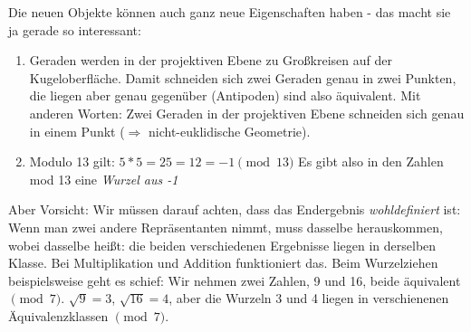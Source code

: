 \documentclass{article}
\begin{document}
Die neuen Objekte können auch ganz neue Eigenschaften haben - das macht sie ja
gerade so interessant:

\begin{enumerate}
\item Geraden werden in der projektiven Ebene zu Großkreisen auf der
  Kugeloberfläche. Damit schneiden sich zwei Geraden genau in zwei Punkten,
  die liegen aber genau gegenüber (Antipoden) sind also äquivalent. Mit
  anderen Worten: Zwei Geraden in der projektiven Ebene schneiden sich genau
  in einem Punkt ($\Rightarrow$ nicht-euklidische Geometrie).
\item Modulo 13 gilt: $ 5 * 5 = 25 = 12 = -1 \pmod{13} $
  Es gibt also in den Zahlen mod 13 eine \emph{Wurzel aus -1}
\end{enumerate}

Aber Vorsicht: Wir müssen darauf achten, dass das Endergebnis \emph{wohldefiniert}
ist: Wenn man zwei andere Repräsentanten nimmt, muss dasselbe herauskommen,
wobei dasselbe heißt: die beiden verschiedenen Ergebnisse liegen in derselben
Klasse. Bei Multiplikation und Addition funktioniert das. Beim Wurzelziehen
beispielsweise geht es schief: Wir nehmen zwei Zahlen, 9 und 16, beide
äquivalent $\pmod 7$. $\sqrt 9 = 3$, $\sqrt{16} = 4$, aber die Wurzeln
3 und 4 liegen in verschienenen Äquivalenzklassen $\pmod 7$.
\end{document}
